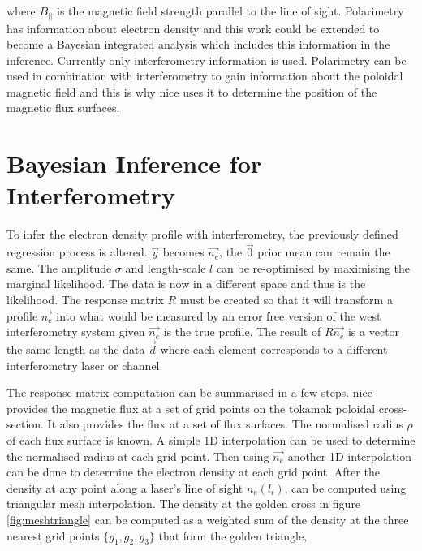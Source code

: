 \noindent where $B_{||}$ is the magnetic field strength parallel to the line of sight. Polarimetry has information about electron density and this work could be extended to become a Bayesian integrated analysis which includes this information in the inference. Currently only interferometry information is used. Polarimetry can be used in combination with interferometry to gain information about the poloidal magnetic field and this is why \gls{nice} uses it to determine the position of the magnetic flux surfaces.

\section{Bayesian Inference for Interferometry}\label{sec:InfForInterf}

To infer the electron density profile with interferometry, the previously defined regression process is altered. $\vec{y}$ becomes $\vec{n_e}$, the $\vec{0}$ prior mean can remain the same. The amplitude $\sigma$ and length-scale $l$ can be re-optimised by maximising the marginal likelihood. The data is now in a different space and thus is the likelihood. The response matrix $R$ must be created so that it will transform a profile $\vec{n_e}$ into what would be measured by an error free version of the \gls{west} interferometry system given $\vec{n_e}$ is the true profile. The result of $R \vec{n_e}$ is a vector the same length as the data $\vec{d}$ where each element corresponds to a different interferometry laser or channel. 

The response matrix computation can be summarised in a few steps. \Gls{nice} provides the magnetic flux at a set of grid points on the tokamak poloidal cross-section. It also provides the flux at a set of flux surfaces. The normalised radius $\rho$ of each flux surface is known. A simple 1D interpolation can be used to determine the normalised radius at each grid point. Then using $\vec{n_e}$ another 1D interpolation can be done to determine the electron density at each grid point. After the density at any point along a laser's line of sight $n_e(l_i)$, can be computed using triangular mesh interpolation. The density at the golden cross in figure \ref{fig:meshtriangle} can be computed as a weighted sum of the density at the three nearest grid points $\{g_1, g_2, g_3\}$ that form the golden triangle,


